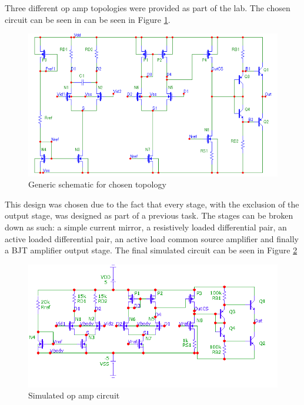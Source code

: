 



Three different op amp topologies were provided as part of the lab. The chosen circuit can be seen in can be seen in Figure \ref{fig:default}.

\begin{figure}[H]
    \begin{center}
    \includegraphics[scale=.45]{Simulations/default_circ.png}
    \caption{Generic schematic for chosen topology \cite{b2}}
    \label{fig:default}
    \end{center}
\end{figure}
This design was chosen due to the fact that every stage, with the exclusion of the output stage, was designed as part of a previous task. The stages can be broken down as such: a simple current mirror, a resistively loaded differential pair, an active loaded differential pair, an active load common source amplifier and finally a BJT amplifier output stage. The final simulated circuit can be seen in Figure \ref{fig:simcircuit}

\begin{figure}[H]
    \begin{center}
    \includegraphics[scale=.45]{Simulations/simcircuit.png}
    \caption{Simulated op amp circuit}
    \label{fig:simcircuit}
    \end{center}
\end{figure}

